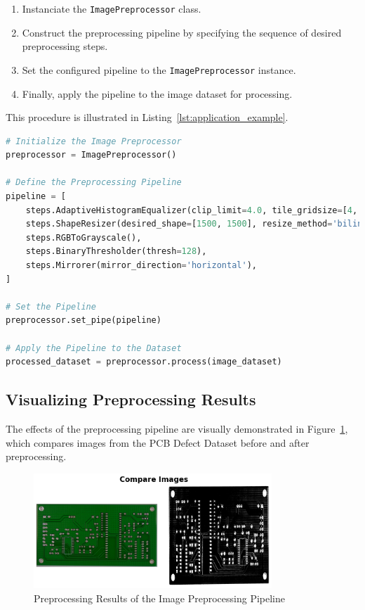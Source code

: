 \documentclass[journal ]{new-aiaa}
\begin{document}
\begin{enumerate}
    \item Instanciate the \texttt{ImagePreprocessor} class.
    \item Construct the preprocessing pipeline by specifying the sequence of desired preprocessing steps.
    \item Set the configured pipeline to the \texttt{ImagePreprocessor} instance.
    \item Finally, apply the pipeline to the image dataset for processing.
\end{enumerate}
This procedure is illustrated in Listing~\ref{lst:application_example}.
\begin{lstlisting}[language=Python, caption=Example of Applying the Image Preprocessing Pipeline, label=lst:application_example]
# Initialize the Image Preprocessor
preprocessor = ImagePreprocessor()

# Define the Preprocessing Pipeline
pipeline = [
    steps.AdaptiveHistogramEqualizer(clip_limit=4.0, tile_gridsize=[4, 4]),
    steps.ShapeResizer(desired_shape=[1500, 1500], resize_method='bilinear'),
    steps.RGBToGrayscale(),
    steps.BinaryThresholder(thresh=128),
    steps.Mirrorer(mirror_direction='horizontal'),
]

# Set the Pipeline 
preprocessor.set_pipe(pipeline)

# Apply the Pipeline to the Dataset
processed_dataset = preprocessor.process(image_dataset)
\end{lstlisting}

\subsection{Visualizing Preprocessing Results}
The effects of the preprocessing pipeline are visually demonstrated in Figure~\ref{fig:preprocessing_results}, which compares images from the PCB Defect Dataset before and after preprocessing.

\begin{figure}[h]
    \centering
    \includegraphics[width=0.8\textwidth]{preprocessing_results.png}
    \caption{Preprocessing Results of the Image Preprocessing Pipeline}
    \label{fig:preprocessing_results}
\end{figure}
\end{document}
